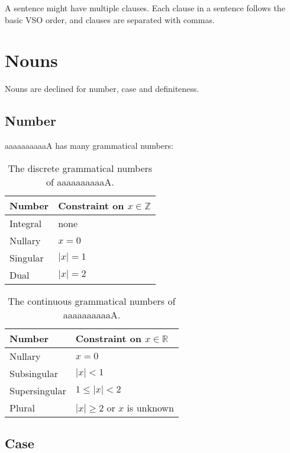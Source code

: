 \documentclass{book}
\newcommand{\lname}{aaaaaaaaaaA}
\begin{document}
A sentence might have multiple clauses. Each clause in a sentence follows the basic VSO order, and clauses are separated with commas.

\chapter{Nouns}

Nouns are declined for number, case and definiteness.

\section{Number}

\lname{} has many grammatical numbers:

\begin{table}[h]
    \centering
    \caption{The discrete grammatical numbers of \lname.}
    \label{table:gnumbers}
    \begin{tabular}{|l|l|}
        \hline
        Number & Constraint on $x \in \mathbb{Z}$ \\
        \hline
        Integral & none \\
        Nullary & $x = 0$ \\
        Singular & $|x| = 1$ \\
        Dual & $|x| = 2$ \\
        \hline
    \end{tabular}
\end{table}

\begin{table}[h]
    \centering
    \caption{The continuous grammatical numbers of \lname.}
    \label{table:gnumbersc}
    \begin{tabular}{|l|l|}
        \hline
        Number & Constraint on $x \in \mathbb{R}$ \\
        \hline
        Nullary & $x = 0$ \\
        Subsingular & $|x| < 1$ \\
        Supersingular & $1 \le |x| < 2$ \\
        Plural & $|x| \ge 2$ or $x$ is unknown \\
        \hline
    \end{tabular}
\end{table}

\section{Case}
\end{document}
